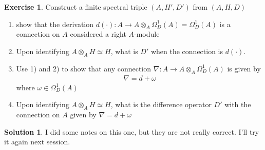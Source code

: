 \documentclass[a4paper]{article}
\theoremstyle{definition}
\theoremstyle{definition}
\theoremstyle{definition}
\theoremstyle{theorem}
\theoremstyle{theorem}
\theoremstyle{theorem}
\newtheorem{exercise}{Exercise}
\theoremstyle{definition}
\newtheorem{solution}{Solution}
\begin{document}
\begin{exercise}
    Construct a finite spectral triple $(A, H', D')$ from $(A, H, D)$
    \begin{enumerate}
        \item show that the derivation $d(\cdot):A \rightarrow A\otimes _A
            \Omega_D^1(A)=\Omega_D^1(A)$ is a connection on $A$
            considered a right $A$-module
        \item Upon identifying $A\otimes_A H\simeq H$, what is $D'$
            when the connection is $d(\cdot)$.
        \item Use 1) and 2) to show that any connection $\nabla:
            A\rightarrow A\otimes_A \Omega_D^1(A)$ is given by
            \begin{align*}
                \nabla = d + \omega
            \end{align*}
            where $\omega \in \Omega_D^1(A)$
        \item Upon identifying $A\otimes_A H \simeq H$, what is the
            difference operator $D'$ with the connection on $A$ given by
            $\nabla = d + \omega$
    \end{enumerate}
\end{exercise}
\begin{solution}
    I did some notes on this one, but they are not really correct. I'll try
    it again next session.
\end{solution}
\end{document}
